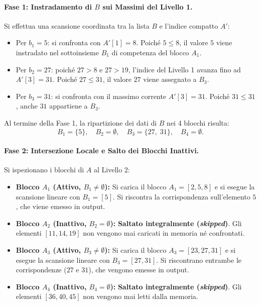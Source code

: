 \paragraph{Fase 1: Instradamento di $B$ sui Massimi del Livello 1.}
Si effettua una scansione coordinata tra la lista $B$ e l'indice compatto $A'$:
\begin{itemize}
  \item Per $b_1 = 5$: si confronta con $A'[1] = 8$. Poich\'e $5 \le 8$, il valore $5$ viene instradato nel sottoinsieme $B_1$ di competenza del blocco $A_1$.
  \item Per $b_2 = 27$: poich\'e $27 > 8$ e $27 > 19$, l'indice del Livello 1 avanza fino ad $A'[3] = 31$. Poich\'e $27 \le 31$, il valore $27$ viene assegnato a $B_3$.
  \item Per $b_3 = 31$: si confronta con il massimo corrente $A'[3] = 31$. Poich\'e $31 \le 31$, anche $31$ appartiene a $B_3$.
\end{itemize}
Al termine della Fase 1, la ripartizione dei dati di $B$ nei 4 blocchi risulta:
\begin{equation}
  B_1 = \{5\}, \quad B_2 = \emptyset, \quad B_3 = \{27, \; 31\}, \quad B_4 = \emptyset.
\end{equation}

\paragraph{Fase 2: Intersezione Locale e Salto dei Blocchi Inattivi.}
Si ispezionano i blocchi di $A$ al Livello 2:
\begin{itemize}
  \item \textbf{Blocco $A_1$ (Attivo, $B_1 \neq \emptyset$):} Si carica il blocco $A_1 = [2, 5, 8]$ e si esegue la scansione lineare con $B_1 = [5]$. Si riscontra la corrispondenza sull'elemento $5$, che viene emesso in output.
  \item \textbf{Blocco $A_2$ (Inattivo, $B_2 = \emptyset$):} \textbf{Saltato integralmente (\textit{skipped})}. Gli elementi $[11, 14, 19]$ non vengono mai caricati in memoria n\'e confrontati.
  \item \textbf{Blocco $A_3$ (Attivo, $B_3 \neq \emptyset$):} Si carica il blocco $A_3 = [23, 27, 31]$ e si esegue la scansione lineare con $B_3 = [27, 31]$. Si riscontrano entrambe le corrispondenze ($27$ e $31$), che vengono emesse in output.
  \item \textbf{Blocco $A_4$ (Inattivo, $B_4 = \emptyset$):} \textbf{Saltato integralmente (\textit{skipped})}. Gli elementi $[36, 40, 45]$ non vengono mai letti dalla memoria.
\end{itemize}

